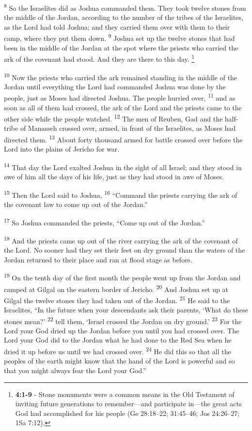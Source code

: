 \documentclass[12pt,twoside]{article}
\newcommand{\vs}[1]{\textsuperscript{#1}}
\newcommand{\vnote}[2]{%
  \begingroup
  \renewcommand\thefootnote{}%
  \footnote{\scriptsize \textbf{}#2}%
  \addtocounter{footnote}{-1}%
  \endgroup
}
\begin{document}
\vs{8} So the Israelites did as Joshua commanded them. They took twelve stones from the middle of the Jordan, according to the number of the tribes of the Israelites, as the Lord had told Joshua; and they carried them over with them to their camp, where they put them down.
\vs{9} Joshua set up the twelve stones that had been in the middle of the Jordan at the spot where the priests who carried the ark of the covenant had stood. And they are there to this day.\vnote{9}{\textbf{4:1-9} - Stone monuments were a common means in the Old Testament of inviting future generations to remember—and
participate in—the great acts God had accomplished for his people (Ge 28:18–22; 31:45–46; Jos 24:26–27; 1Sa 7:12).}

\vs{10} Now the priests who carried the ark remained standing in the middle of the Jordan until everything the Lord had commanded Joshua was done by the people, just as Moses had directed Joshua. The people hurried over,
\vs{11} and as soon as all of them had crossed, the ark of the Lord and the priests came to the other side while the people watched.
\vs{12} The men of Reuben, Gad and the half-tribe of Manasseh crossed over, armed, in front of the Israelites, as Moses had directed them.
\vs{13} About forty thousand armed for battle crossed over before the Lord into the plains of Jericho for war.

\vs{14} That day the Lord exalted Joshua in the sight of all Israel; and they stood in awe of him all the days of his life, just as they had stood in awe of Moses.

\vs{15} Then the Lord said to Joshua,
\vs{16} ``Command the priests carrying the ark of the covenant law to come up out of the Jordan.''

\vs{17} So Joshua commanded the priests, ``Come up out of the Jordan.''

\vs{18} And the priests came up out of the river carrying the ark of the covenant of the Lord. No sooner had they set their feet on dry ground than the waters of the Jordan returned to their place and ran at flood stage as before.

\vs{19} On the tenth day of the first month the people went up from the Jordan and camped at Gilgal on the eastern border of Jericho.
\vs{20} And Joshua set up at Gilgal the twelve stones they had taken out of the Jordan.
\vs{21} He said to the Israelites, ``In the future when your descendants ask their parents, `What do these stones mean?'
\vs{22} tell them, `Israel crossed the Jordan on dry ground.'
\vs{23} For the Lord your God dried up the Jordan before you until you had crossed over. The Lord your God did to the Jordan what he had done to the Red Sea when he dried it up before us until we had crossed over.
\vs{24} He did this so that all the peoples of the earth might know that the hand of the Lord is powerful and so that you might always fear the Lord your God.''
\end{document}
